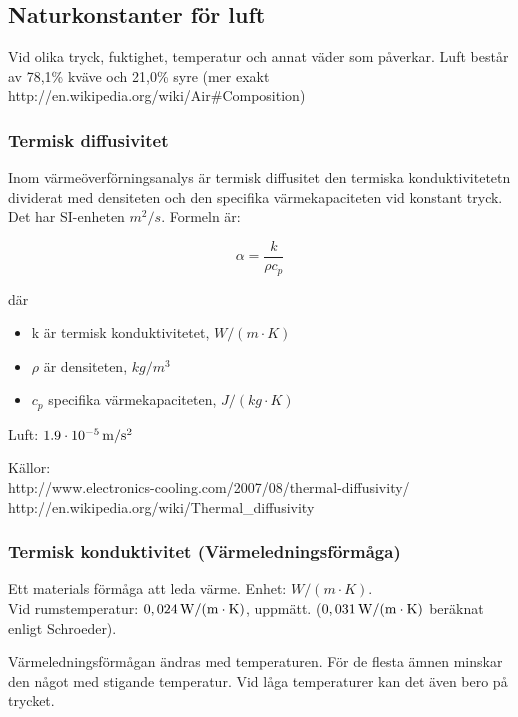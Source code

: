 \subsection{Naturkonstanter för luft}

Vid olika tryck, fuktighet, temperatur och annat väder som påverkar. Luft består av 78,1\% kväve och 21,0\% syre (mer exakt http://en.wikipedia.org/wiki/Air\#Composition)


\subsubsection{Termisk diffusivitet} %
Inom värmeöverförningsanalys är termisk diffusitet den termiska konduktivitetetn dividerat med densiteten och den specifika värmekapaciteten vid konstant tryck. Det har SI-enheten $m^2/s$. Formeln är:

\begin{equation}
\alpha=\frac{k}{\rho c_p}
\end{equation}

där 
\begin{itemize}
   \item[] k är termisk konduktivitetet, $\unit{W/(m\cdot K)}$
   \item[] $\rho$ är densiteten, $\unit{kg/m^3}$
   \item[] $c_p$ specifika värmekapaciteten, $\unit{J/(kg\cdot K)}$
\end{itemize}

Luft: $\unit[1.9\cdot10^{-5}]{m/s^2}$

Källor:\\
http://www.electronics-cooling.com/2007/08/thermal-diffusivity/\\
http://en.wikipedia.org/wiki/Thermal\_diffusivity\\


\subsubsection{Termisk konduktivitet (Värmeledningsförmåga)} %
Ett materials förmåga att leda värme. Enhet: $W/(m\cdot K)$.\\
Vid rumstemperatur: $\unit[0,024]{W/(m\cdot K)}$, uppmätt. ($\unit[0,031]{W/(m\cdot K)}$ beräknat enligt Schroeder).

Värmeledningsförmågan ändras med temperaturen. För de flesta ämnen minskar den något med stigande temperatur. Vid låga temperaturer kan det även bero på trycket.

